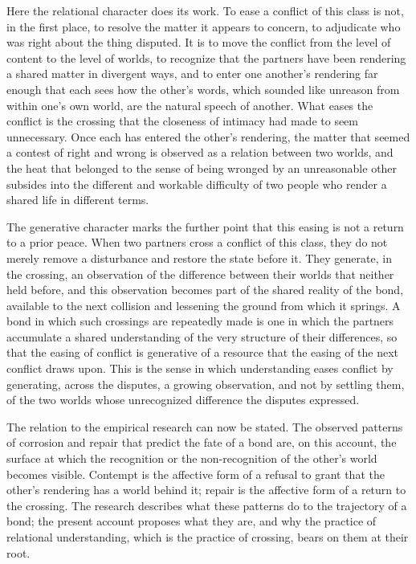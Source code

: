 Here the relational character does its work. To ease a conflict of this class is not, in the first place, to resolve the matter it appears to concern, to adjudicate who was right about the thing disputed. It is to move the conflict from the level of content to the level of worlds, to recognize that the partners have been rendering a shared matter in divergent ways, and to enter one another's rendering far enough that each sees how the other's words, which sounded like unreason from within one's own world, are the natural speech of another. What eases the conflict is the crossing that the closeness of intimacy had made to seem unnecessary. Once each has entered the other's rendering, the matter that seemed a contest of right and wrong is observed as a relation between two worlds, and the heat that belonged to the sense of being wronged by an unreasonable other subsides into the different and workable difficulty of two people who render a shared life in different terms.

The generative character marks the further point that this easing is not a return to a prior peace. When two partners cross a conflict of this class, they do not merely remove a disturbance and restore the state before it. They generate, in the crossing, an observation of the difference between their worlds that neither held before, and this observation becomes part of the shared reality of the bond, available to the next collision and lessening the ground from which it springs. A bond in which such crossings are repeatedly made is one in which the partners accumulate a shared understanding of the very structure of their differences, so that the easing of conflict is generative of a resource that the easing of the next conflict draws upon. This is the sense in which understanding eases conflict by generating, across the disputes, a growing observation, and not by settling them, of the two worlds whose unrecognized difference the disputes expressed.

The relation to the empirical research can now be stated. The observed patterns of corrosion and repair that predict the fate of a bond are, on this account, the surface at which the recognition or the non-recognition of the other's world becomes visible. Contempt is the affective form of a refusal to grant that the other's rendering has a world behind it; repair is the affective form of a return to the crossing. The research describes what these patterns do to the trajectory of a bond; the present account proposes what they are, and why the practice of relational understanding, which is the practice of crossing, bears on them at their root.
